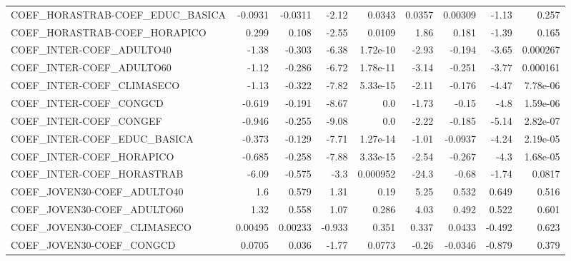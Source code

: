 \begin{tabular}{lrrrrrrrr}
COEF\_HORASTRAB-COEF\_EDUC\_BASICA       &     -0.0931 &      -0.0311 &   -2.12 &   0.0343 &     0.0357 &     0.00309 &        -1.13 &         0.257 \\
COEF\_HORASTRAB-COEF\_HORAPICO          &       0.299 &        0.108 &   -2.55 &   0.0109 &       1.86 &       0.181 &        -1.39 &         0.165 \\
COEF\_INTER-COEF\_ADULTO40              &       -1.38 &       -0.303 &   -6.38 & 1.72e-10 &      -2.93 &      -0.194 &        -3.65 &      0.000267 \\
COEF\_INTER-COEF\_ADULTO60              &       -1.12 &       -0.286 &   -6.72 & 1.78e-11 &      -3.14 &      -0.251 &        -3.77 &      0.000161 \\
COEF\_INTER-COEF\_CLIMASECO             &       -1.13 &       -0.322 &   -7.82 & 5.33e-15 &      -2.11 &      -0.176 &        -4.47 &      7.78e-06 \\
COEF\_INTER-COEF\_CONGCD                &      -0.619 &       -0.191 &   -8.67 &      0.0 &      -1.73 &       -0.15 &         -4.8 &      1.59e-06 \\
COEF\_INTER-COEF\_CONGEF                &      -0.946 &       -0.255 &   -9.08 &      0.0 &      -2.22 &      -0.185 &        -5.14 &      2.82e-07 \\
COEF\_INTER-COEF\_EDUC\_BASICA           &      -0.373 &       -0.129 &   -7.71 & 1.27e-14 &      -1.01 &     -0.0937 &        -4.24 &      2.19e-05 \\
COEF\_INTER-COEF\_HORAPICO              &      -0.685 &       -0.258 &   -7.88 & 3.33e-15 &      -2.54 &      -0.267 &         -4.3 &      1.68e-05 \\
COEF\_INTER-COEF\_HORASTRAB             &       -6.09 &       -0.575 &    -3.3 & 0.000952 &      -24.3 &       -0.68 &        -1.74 &        0.0817 \\
COEF\_JOVEN30-COEF\_ADULTO40            &         1.6 &        0.579 &    1.31 &     0.19 &       5.25 &       0.532 &        0.649 &         0.516 \\
COEF\_JOVEN30-COEF\_ADULTO60            &        1.32 &        0.558 &    1.07 &    0.286 &       4.03 &       0.492 &        0.522 &         0.601 \\
COEF\_JOVEN30-COEF\_CLIMASECO           &     0.00495 &      0.00233 &  -0.933 &    0.351 &      0.337 &      0.0433 &       -0.492 &         0.623 \\
COEF\_JOVEN30-COEF\_CONGCD              &      0.0705 &        0.036 &   -1.77 &   0.0773 &      -0.26 &     -0.0346 &       -0.879 &         0.379 \\

\end{tabular}
